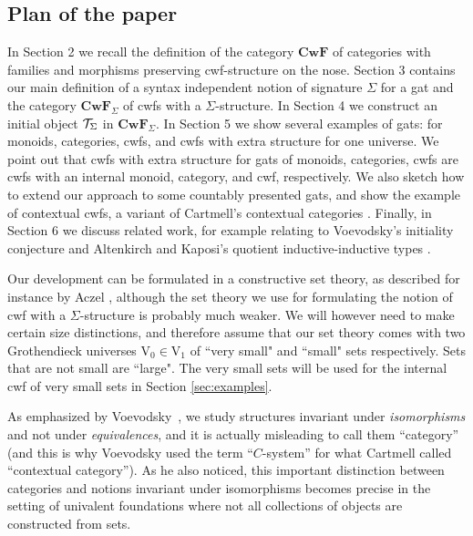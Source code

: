 \documentclass{lmcs}
\def\V{\mathrm{V}}
\def\Cwf{\mathbf{CwF}}
\begin{document}

\subsection*{Plan of the paper}

In Section 2 we recall the definition of the category $\Cwf$ of categories with families and morphisms preserving cwf-structure on the nose. Section 3 contains our main definition of a syntax independent notion of signature $\Sigma$ for a gat and the category $\Cwf_\Sigma$ of cwfs with a $\Sigma$-structure. In Section 4 we construct an initial object ${\mathcal T}_\Sigma$ in $\Cwf_\Sigma$. In Section 5 we show several examples of gats: for monoids, categories, cwfs, and cwfs with extra structure for one universe. We point out that cwfs with extra structure for gats of monoids, categories, cwfs are cwfs with an internal monoid, category, and cwf, respectively. We also sketch how to extend our approach to some countably presented gats, and show the example of contextual cwfs, a variant of Cartmell's contextual categories \cite{cartmell:phd,cartmell:apal}. Finally, in Section 6 we discuss related work, for example relating to Voevodsky's initiality conjecture \cite{voevodsky:initiality} and Altenkirch and Kaposi's quotient inductive-inductive types \cite{altenkirch:qiits}.

Our development can be formulated in a constructive set theory,
as described for instance by Aczel \cite{MR519801}, although the set theory
we use for formulating the notion of cwf with a $\Sigma$-structure is probably
much weaker. We will however need to make certain size distinctions, and therefore assume that our set theory comes with two Grothendieck universes $\V_0 \in \V_1$ of ``very small" and ``small" sets respectively. Sets that are not small are ``large". The very small sets will be used for the internal cwf of very small sets in Section \ref{sec:examples}.

As emphasized by Voevodsky~\cite{voevodsky:initiality}, we study structures invariant
under {\em isomorphisms} and not under {\em equivalences}, and it is actually misleading
to call them ``category'' (and this is why Voevodsky used the term ``$C$-system''
for what Cartmell called ``contextual category'').
As he also noticed, this
important distinction between categories and notions invariant under isomorphisms becomes
precise in the setting of univalent foundations where not all collections of objects
are constructed from sets.
\end{document}
